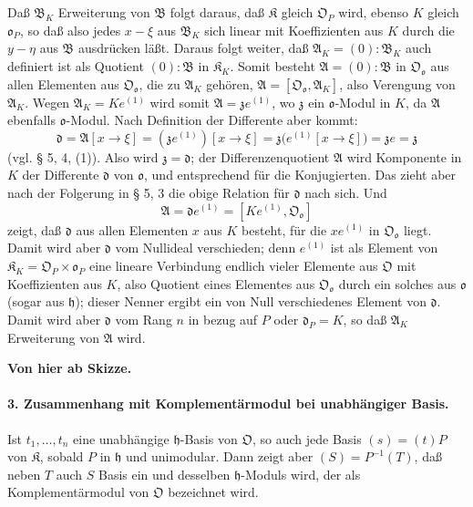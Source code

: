 Daß $\mathfrak B_K$ Erweiterung von $\mathfrak B$ folgt daraus, daß $\mathfrak K$ gleich $\mathfrak O_P$ wird, ebenso $K$ gleich $\mathfrak o_P$, so daß also jedes $x-\xi$ aus $\mathfrak B_K$ sich linear mit Koeffizienten aus $K$ durch die $y-\eta$ aus $\mathfrak B$ ausdrücken läßt. Daraus folgt weiter, daß $\mathfrak A_K=(0):\mathfrak B_K$ auch definiert ist als Quotient $(0):\mathfrak B$ in $\mathfrak K_K$. Somit besteht $\mathfrak A=(0):\mathfrak B$ in $\mathfrak O_{\mathfrak o}$ aus allen Elementen aus $\mathfrak O_{\mathfrak o}$, die zu $\mathfrak A_K$ gehören, $\mathfrak A=[\mathfrak O_{\mathfrak o},\mathfrak A_K]$, also Verengung von $\mathfrak A_K$. Wegen $\mathfrak A_K=Ke^{(1)}$ wird somit $\mathfrak A=\mathfrak z e^{(1)}$, wo $\mathfrak z$ ein $\mathfrak o$-Modul in $K$, da $\mathfrak A$ ebenfalls $\mathfrak o$-Modul. Nach Definition der Differente aber kommt:
\[
\mathfrak d=\mathfrak A[x\to\xi]
=(\mathfrak z e^{(1)})[x\to\xi]
=\mathfrak z\bigl(e^{(1)}[x\to\xi]\bigr)=\mathfrak z e=\mathfrak z
\]
(vgl. § 5, 4, (1)). Also wird $\mathfrak z=\mathfrak d$; der Differenzenquotient $\mathfrak A$ wird Komponente in $K$ der Differente $\mathfrak d$ von $\mathfrak o$, und entsprechend für die Konjugierten. Das zieht aber nach der Folgerung in § 5, 3 die obige Relation für $\mathfrak d$ nach sich. Und
\[
\mathfrak A=\mathfrak d e^{(1)}=[Ke^{(1)},\mathfrak O_{\mathfrak o}]
\]
zeigt, daß $\mathfrak d$ aus allen Elementen $x$ aus $K$ besteht, für die $xe^{(1)}$ in $\mathfrak O_{\mathfrak o}$ liegt. Damit wird aber $\mathfrak d$ vom Nullideal verschieden; denn $e^{(1)}$ ist als Element von $\mathfrak K_K=\mathfrak O_P\times\mathfrak o_P$ eine lineare Verbindung endlich vieler Elemente aus $\mathfrak O$ mit Koeffizienten aus $K$, also Quotient eines Elementes aus $\mathfrak O_{\mathfrak o}$ durch ein solches aus $\mathfrak o$ (sogar aus $\mathfrak h$); dieser Nenner ergibt ein von Null verschiedenes Element von $\mathfrak d$. Damit wird aber $\mathfrak d$ vom Rang $n$ in bezug auf $P$ oder $\mathfrak d_P=K$, so daß $\mathfrak A_K$ Erweiterung von $\mathfrak A$ wird.

\begin{center}
\textbf{Von hier ab Skizze.}
\end{center}

\paragraph{3. Zusammenhang mit Komplementärmodul bei unabhängiger Basis.}
Ist $t_1,\ldots,t_n$ eine unabhängige $\mathfrak h$-Basis von $\mathfrak O$, so auch jede Basis $(s)=(t)P$ von $\mathfrak K$, sobald $P$ in $\mathfrak h$ und unimodular. Dann zeigt aber $(S)=P^{-1}(T)$, daß neben $T$ auch $S$ Basis ein und desselben $\mathfrak h$-Moduls wird, der als Komplementärmodul von $\mathfrak O$ bezeichnet wird.

